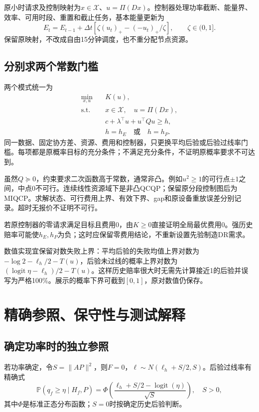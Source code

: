 \documentclass[UTF8,11pt,a4paper,fontset=fandol]{ctexart}
\newcommand{\Prob}{\mathbb P}
\newcommand{\logit}{\operatorname{logit}}
\numberwithin{equation}{section}
\begin{document}
原小时请求及控制映射为$x\in\mathcal X$、$u=\Pi(Dx)$。控制器处理功率截断、能量界、效率、可用时段、重置和截止任务，基本能量更新为
\[
E_t=E_{t-1}+\Delta t[\zeta(u_t)_+-(-u_t)_+/\zeta],\qquad\zeta\in(0,1].
\]
保留原映射，不改成自由15分钟调度，也不重分配节点资源。

\subsection{分别求两个常数门槛}
两个模式统一为
\begin{equation}
\boxed{\begin{aligned}
\min_{x,u}\quad &K(u),\\
\text{s.t.}\quad &x\in\mathcal X,\quad u=\Pi(Dx),\\
&c+\lambda^\top u+u^\top Qu\ge h,\\
&h=h_E\quad\text{或}\quad h=h_P.
\end{aligned}}
\label{eq:optimization}
\end{equation}
同一数据、固定协方差、资源、费用和控制器，只更换平均后验或后验过线率门槛。每项都是原概率目标的充分条件；不满足充分条件，不证明原概率要求不可达到。

虽然$Q\succeq0$，约束要求二次函数高于常数，通常非凸。例如$u^2\ge1$的可行点$\pm1$之间，中点0不可行。连续线性资源域下是非凸QCQP；保留原分段控制图后为MIQCP。求解状态、可行费用上界、有效下界、gap和原设备重放误差分别记录。超时无报价不证明不可行。

若原控制器的零请求满足目标且费用0，由$K\ge0$直接证明全局最优费用0。强历史赔率可能使$h_E,h_P$为负；这时应保留零费用结论，不重新设置先验制造DR需求。

数值实现宜保留对数失败上界：平均后验的失败均值上界对数为$-\log2-\ell_h/2-T(u)$，后验未过线的概率上界对数为$(\logit\eta-\ell_h)/2-T(u)$。这样历史赔率很大时无需先计算接近1的后验并误写为严格100\%。展示的概率下界可截到$[0,1]$，原对数值仍保存。

\section{精确参照、保守性与测试解释}
\label{sec:evaluation}
\subsection{确定功率时的独立参照}
若功率确定，令$S=\|AP\|^2$，则$F=0$，$\ell\sim N(\ell_h+S/2,S)$。后验过线率有精确式
\begin{equation}
\Prob(q_f\ge\eta\mid H_f,P)
=\Phi\!\left(\frac{\ell_h+S/2-\logit(\eta)}{\sqrt S}\right),\quad S>0,
\end{equation}
其中$\Phi$是标准正态分布函数；$S=0$时按确定历史后验判断。
\end{document}
